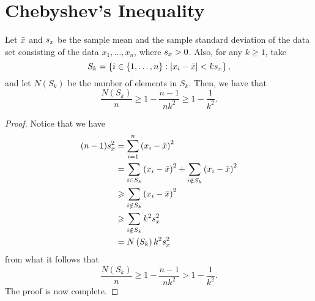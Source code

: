 \section{Chebyshev's Inequality}\label{sec:chebyshevs-inequality}

\begin{theorem}\label{thm:chebyshevs-inequality}
  Let \(\bar{x}\) and \(s_{x}\) be the sample mean
  and the sample standard deviation of the data set consisting of the data
  \(x_{1},\ldots,x_{n}\), where \(s_{x}>0\). Also, for any
  \(k\geqslant{1}\), take
  \[
    S_{k}
    =
    \left\{
      i\in{\left\{1,\ldots,n\right\}}
      :
      \lvert x_{i}-\bar{x}\rvert<ks_{x}
    \right\},
  \]
  and let \(N\left(S_{k}\right)\) be the number of elements in \(S_{k}\).
  Then, we have that
  \[
    \frac{N\left(S_{k}\right)}{n}
    \geqslant
    1-\frac{n-1}{nk^{2}}
    \geqslant
    1-\frac{1}{k^{2}}.
  \]
\end{theorem}

\begin{proof}
  Notice that we have
  \begin{align*}
    (n-1)s_{x}^{2}
    &=
    \sum_{i=1}^{n}\left(x_{i}-\bar{x}\right)^{2}
    \\
    &=
    \sum_{i\in{S_{k}}}\left(x_{i}-\bar{x}\right)^{2}
    +
    \sum_{i\notin{S_{k}}}\left(x_{i}-\bar{x}\right)^{2}
    \\
    &\geqslant
    \sum_{i\notin{S_{k}}}\left(x_{i}-\bar{x}\right)^{2}
    \\
    &\geqslant
    \sum_{i\notin{S_{k}}}k^{2}s_{x}^{2}
    \\
    &=N\left(S_{k}\right)k^{2}s_{x}^{2}
  \end{align*}
  from what it follows that
  \[
    \frac{N\left(S_{k}\right)}{n}
    \geqslant
    1-\frac{n-1}{nk^{2}}
    >
    1-\frac{1}{k^{2}}.
  \]
  The proof is now complete.
\end{proof}

